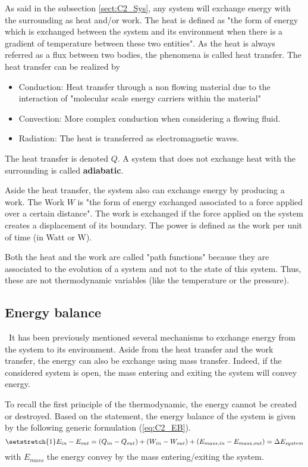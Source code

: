 As said in the subsection \ref{sect:C2_Sys}, any system will exchange energy with the surrounding as heat and/or work. The heat is defined as "the form of energy which is exchanged between the system and its environment when there is a gradient of temperature between these two entities". As the heat is always referred as a flux between two bodies, the phenomena is called heat transfer. The heat transfer can be realized by
\begin{itemize}
    \item Conduction: Heat transfer through a non flowing material due to the interaction of "molecular scale energy carriers within the material"\cite{GregoryNellis2015}
    \item Convection: More complex conduction when considering a flowing fluid.
    \item Radiation: The heat is transferred as electromagnetic waves.
\end{itemize}
The heat transfer is denoted $Q$. A system that does not exchange heat with the surrounding is called \textbf{adiabatic}.

Aside the heat transfer, the system also can exchange energy by producing a work. The Work $W$ is "the form of energy exchanged associated to a force applied over a certain distance". The work is exchanged if the force applied on the system creates a displacement of its boundary. The power is defined as the work per unit of time (in Watt or W).

Both the heat and the work are called "path functions" because they are associated to the evolution of a system and not to the state of this system. Thus, these are not thermodynamic variables (like the temperature or the pressure).

\subsection{Energy balance}
\quad\, It has been previously mentioned several mechanisms to exchange energy from the system to its environment. Aside from the heat transfer and the work transfer, the energy can also be exchange using mass transfer. Indeed, if the considered system is open, the mass entering and exiting the system will convey energy.

To recall the first principle of the thermodynamic, the energy cannot be created or destroyed. Based on the statement, the energy balance of the system is given by the following generic formulation (\ref{eq:C2_EB}).
\begin{equation}
\setstretch{1}
    E_{in} - E_{out} = (Q_{in} - Q_{out}) + (W_{in} - W_{out}) + (E_{mass,in} - E_{mass,out}) = \Delta E_{system} \label{eq:C2_EB}
\end{equation}
with $E_{mass}$ the energy convey by the mass entering/exiting the system.

